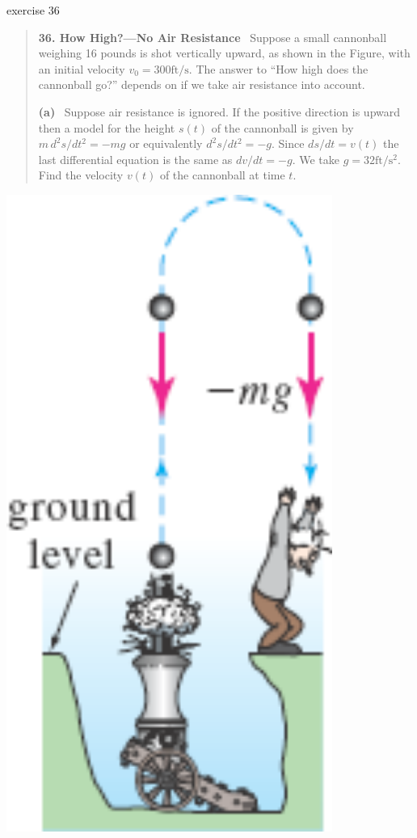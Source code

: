 \documentclass{beamer}
\begin{document}
\begin{frame}{exercise 36}

\begin{minipage}[t]{0.8\textwidth}
\small
\begin{quotation}
\noindent \textbf{36. How High?---No Air Resistance} \, Suppose a small cannonball weighing 16 pounds is shot vertically upward, as shown in the Figure, with an initial velocity $v_0 = 300 \text{ft}/\text{s}$.  The answer to ``How high does the cannonball go?'' depends on if we take air resistance into account.

\medskip
\noindent \textbf{(a)} \, Suppose air resistance is ignored.  If the positive direction is upward then a model for the height $s(t)$ of the cannonball is given by $m\, d^2s/dt^2 = - mg$ or equivalently $d^2s/dt^2 = - g$.  Since $ds/dt = v(t)$ the last differential equation is the same as $dv/dt = -g$.  We take $g=32 \text{ft}/\text{s}^2$.  Find the velocity $v(t)$ of the cannonball at time $t$.
\end{quotation}
\end{minipage}
\begin{minipage}[t]{0.2\textwidth}
\vspace{0mm}

\hfill \includegraphics[width=0.8\textwidth]{figs/cannonball-on-head}
\end{minipage}


\end{frame}
\end{document}
